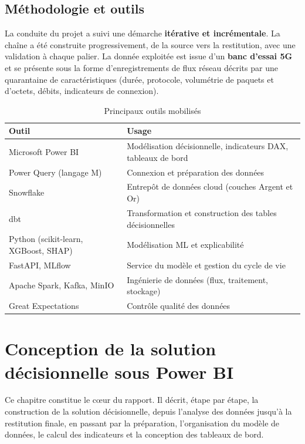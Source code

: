 \documentclass[12pt,a4paper,oneside]{report}
\begin{document}
\section{Méthodologie et outils}
La conduite du projet a suivi une démarche \textbf{itérative et incrémentale}. La chaîne a été construite progressivement, de la source vers la restitution, avec une validation à chaque palier. La donnée exploitée est issue d'un \textbf{banc d'essai 5G} et se présente sous la forme d'enregistrements de flux réseau décrits par une quarantaine de caractéristiques (durée, protocole, volumétrie de paquets et d'octets, débits, indicateurs de connexion).

\begin{table}[h]
\centering
\caption{Principaux outils mobilisés}
\begin{tabularx}{\textwidth}{lX}
\toprule
\textbf{Outil} & \textbf{Usage} \\
\midrule
Microsoft Power BI & Modélisation décisionnelle, indicateurs DAX, tableaux de bord \\
Power Query (langage M) & Connexion et préparation des données \\
Snowflake & Entrepôt de données cloud (couches Argent et Or) \\
dbt & Transformation et construction des tables décisionnelles \\
Python (scikit-learn, XGBoost, SHAP) & Modélisation ML et explicabilité \\
FastAPI, MLflow & Service du modèle et gestion du cycle de vie \\
Apache Spark, Kafka, MinIO & Ingénierie de données (flux, traitement, stockage) \\
Great Expectations & Contrôle qualité des données \\
\bottomrule
\end{tabularx}
\end{table}

\chapter{Conception de la solution décisionnelle sous Power BI}

Ce chapitre constitue le cœur du rapport. Il décrit, étape par étape, la construction de la solution décisionnelle, depuis l'analyse des données jusqu'à la restitution finale, en passant par la préparation, l'organisation du modèle de données, le calcul des indicateurs et la conception des tableaux de bord.
\end{document}

